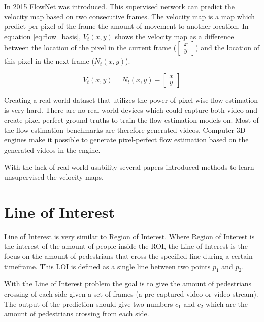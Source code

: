 
In 2015 FlowNet was introduced. This supervised network can predict the velocity map based on two consecutive frames. The velocity map is a map which predict per pixel of the frame the amount of movement to another location. In equation \ref{eq:flow_basis}, $V_t(x, y)$ shows the velocity map as a difference between the location of the pixel in the current frame ($\begin{bmatrix} x \\ y \end{bmatrix}$) and the location of this pixel in the next frame ($N_t(x, y)$).

\begin{equation}
\label{eq:flow_basis}
V_t(x, y) = N_t(x, y) - \begin{bmatrix} x \\ y \end{bmatrix}
\end{equation}

Creating a real world dataset that utilizes the power of pixel-wise flow estimation is very hard. There are no real world devices which could capture both video and create pixel perfect ground-truths to train the flow estimation models on. Most of the flow estimation benchmarks are therefore generated videos. Computer 3D-engines make it possible to generate pixel-perfect flow estimation based on the generated videos in the engine.

With the lack of real world usability several papers introduced methods to learn unsupervised the velocity maps.

\section{Line of Interest}
Line of Interest is very similar to Region of Interest. Where Region of Interest is the interest of the amount of people inside the ROI, the Line of Interest is the focus on the amount of pedestrians that cross the specified line during a certain timeframe. This LOI is defined as a single line between two points $p_1$ and $p_2$.

With the Line of Interest problem the goal is to give the amount of pedestrians crossing of each side given a set of frames (a pre-captured video or video stream). The output of the prediction should give two numbers $c_1$ and $c_2$ which are the amount of pedestrians crossing from each side.

